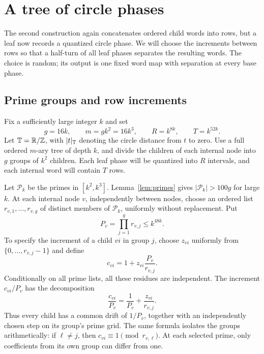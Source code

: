 \section{A tree of circle phases}\label{sec:torus-construction}

The second construction again concatenates ordered child words into
rows, but a leaf now records a quantized circle phase. We will choose
the increments between rows so that a half-turn of all leaf phases
separates the resulting words. The choice is random; its output is one
fixed word map with separation at every base phase.

\subsection{Prime groups and row increments}

Fix a sufficiently large integer $k$ and set
\begin{equation}\label{eq:torus-parameters}
 g=16k,\qquad m=gk^2=16k^3,\qquad
 R=k^{8k},\qquad T=k^{52k}.
\end{equation}
Let $\mathbb T=\mathbb R/\mathbb Z$, with $|t|_{\mathbb T}$ denoting the circle distance from
$t$ to zero. Use a full ordered $m$-ary tree of depth $k$, and divide
the children of each internal node into $g$ groups of $k^2$ children.
Each leaf phase will be quantized into $R$ intervals, and each internal
word will contain $T$ rows.

Let $\mathcal P_k$ be the primes in $[k^2,k^3]$.
Lemma~\ref{lem:primes} gives $|\mathcal P_k|>100g$ for large $k$.
At each internal node $v$, independently between nodes, choose an
ordered list $r_{v,1},\ldots,r_{v,g}$ of distinct members of
$\mathcal P_k$, uniformly without replacement. Put
\[
 P_v=\prod_{j=1}^g r_{v,j}\leq k^{48k}.
\]
To specify the increment of a child $vi$ in group $j$, choose $z_{vi}$
uniformly from $\{0,\ldots,r_{v,j}-1\}$ and define
\begin{equation}\label{eq:torus-coefficients}
 c_{vi}=1+z_{vi}\frac{P_v}{r_{v,j}}.
\end{equation}
Conditionally on all prime lists, all these residues are independent.
The increment $c_{vi}/P_v$ has the decomposition
\[
 \frac{c_{vi}}{P_v}=\frac1{P_v}+\frac{z_{vi}}{r_{v,j}}.
\]
Thus every child has a common drift of $1/P_v$, together with an
independently chosen step on its group's prime grid. The same formula
isolates the groups arithmetically: if $\ell\ne j$, then
$c_{vi}\equiv1\pmod{r_{v,\ell}}$. At each selected prime, only
coefficients from its own group can differ from one.

